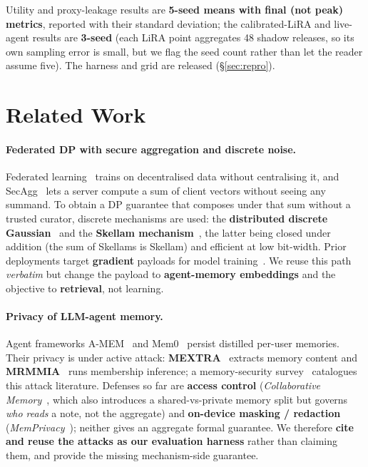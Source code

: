 \documentclass[pdflatex,sn-mathphys-num,iicol]{sn-jnl}
\theoremstyle{thmstyleone}%
\theoremstyle{thmstyletwo}%
\theoremstyle{thmstylethree}%
\newcommand{\secref}[1]{\S\ref{#1}}
\begin{document}
Utility and proxy-leakage results are \textbf{5-seed means with final (not peak) metrics},
reported with their standard deviation; the calibrated-LiRA and live-agent results are
\textbf{3-seed} (each LiRA point aggregates 48 shadow releases, so its own sampling error is
small, but we flag the seed count rather than let the reader assume five). The harness and
grid are released (\secref{sec:repro}).

\section{Related Work}\label{sec:related}

\paragraph{Federated DP with secure aggregation and discrete noise.}
Federated learning~\cite{mcmahan2017fedavg} trains on decentralised data without
centralising it, and SecAgg~\cite{bonawitz2017secagg} lets a server compute a sum
of client vectors without seeing any summand. To obtain a DP guarantee that
composes under that sum without a trusted curator, discrete mechanisms are used:
the \textbf{distributed discrete Gaussian}~\cite{kairouz2021ddgauss} and the
\textbf{Skellam mechanism}~\cite{agarwal2021skellam}, the latter being closed
under addition (the sum of Skellams is Skellam) and efficient at low bit-width.
Prior deployments target \textbf{gradient} payloads for model
training~\cite{abadi2016dpsgd}. We reuse this path \emph{verbatim} but change the
payload to \textbf{agent-memory embeddings} and the objective to
\textbf{retrieval}, not learning.

\paragraph{Privacy of LLM-agent memory.}
Agent frameworks A-MEM~\cite{xu2024amem} and Mem0~\cite{chhikara2024mem0} persist
distilled per-user memories. Their privacy is under active attack:
\textbf{MEXTRA}~\cite{wang2025mextra} extracts memory content and
\textbf{MRMMIA}~\cite{chen2026mrmmia} runs membership inference; a
memory-security survey~\cite{lin2026survey} catalogues this attack literature.
Defenses so far are \textbf{access control} (\emph{Collaborative
Memory}~\cite{rezazadeh2025collabmem}, which also introduces a
shared-vs-private memory split but governs \emph{who reads} a note, not the
aggregate) and \textbf{on-device masking / redaction}
(\emph{MemPrivacy}~\cite{chen2026memprivacy}); neither gives an aggregate formal
guarantee. We therefore \textbf{cite and reuse the attacks as our evaluation
harness} rather than claiming them, and provide the missing mechanism-side
guarantee.
\end{document}
